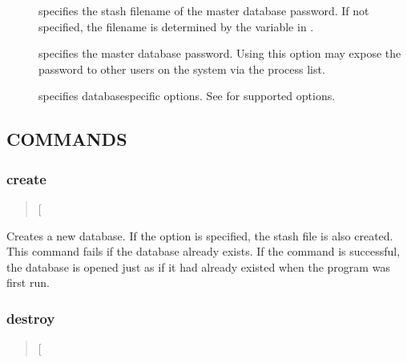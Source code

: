 \documentclass[letterpaper,10pt,english]{sphinxmanual}
\begin{document}
\begin{description}
\item[{ }] \leavevmode
\sphinxAtStartPar
specifies the stash filename of the master database password.  If
not specified, the filename is determined by the
 variable in {\hyperref[\detokenize{admin/conf_files/kdc_conf:kdc-conf-5}]{}}.

\item[{ }] \leavevmode
\sphinxAtStartPar
specifies the master database password.  Using this option may
expose the password to other users on the system via the process
list.

\item[{ }] \leavevmode
\sphinxAtStartPar
specifies database\sphinxhyphen{}specific options.  See {\hyperref[\detokenize{admin/admin_commands/kadmin_local:kadmin-1}]{}} for
supported options.

\end{description}


\subsection{COMMANDS}
\label{\detokenize{admin/admin_commands/kdb5_util:commands}}\label{\detokenize{admin/admin_commands/kdb5_util:kdb5-util-options-end}}

\subsubsection{create}
\label{\detokenize{admin/admin_commands/kdb5_util:create}}\label{\detokenize{admin/admin_commands/kdb5_util:kdb5-util-create}}\begin{quote}

\sphinxAtStartPar
{} {[}\sphinxstylestrong{\sphinxhyphen{}s}{]}
\end{quote}

\sphinxAtStartPar
Creates a new database.  If the  option is specified, the stash
file is also created.  This command fails if the database already
exists.  If the command is successful, the database is opened just as
if it had already existed when the program was first run.


\subsubsection{destroy}
\label{\detokenize{admin/admin_commands/kdb5_util:destroy}}\label{\detokenize{admin/admin_commands/kdb5_util:kdb5-util-create-end}}\label{\detokenize{admin/admin_commands/kdb5_util:kdb5-util-destroy}}\begin{quote}

\sphinxAtStartPar
{} {[}\sphinxstylestrong{\sphinxhyphen{}f}{]}
\end{quote}
\end{document}
